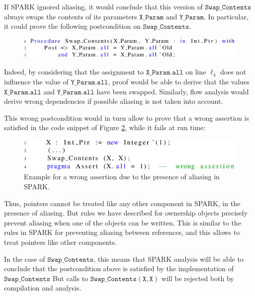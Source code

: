\documentclass{llncs}
\newcommand\var[1]{\ensuremath{\mathtt{#1}}}
\begin{document}
If SPARK ignored aliasing, it would conclude that this version of \var{Swap\_Contents} always swaps the contents of its parameters \var{X\_Param} and \var{Y\_Param}.
In particular, it could prove the following postcondition on \var{Swap\_Contents}.

\begin{figure}[htb!]
\centering
  \captionsetup{justification=centering,margin=0.6cm}
   \includegraphics[]{spark_ex1_proof}
   \label{fig:spark_ex1_proof}
\end{figure}

Indeed, by considering that the assignment to \var{X\_Param.all} on line $\ell_4$ does not influence the value of \var{Y\_Param.all}, proof would be able to
derive that the values \var{X\_Param.all} and \var{Y\_Param.all} have been swapped. Similarly, flow analysis would derive wrong dependencies if possible aliasing is not taken into account.

This wrong postcondition would in turn allow to prove that a wrong assertion is satisfied in the code snippet of Figure \ref{fig:spark_ex1_exp}, while it fails at run time:

\begin{figure}[htb!]
\centering
  \captionsetup{justification=centering,margin=0.6cm}
   \includegraphics[]{spark_ex1_exp}
	\caption{Example for a wrong assertion due to the presence of aliasing in SPARK.}
   \label{fig:spark_ex1_exp}
\end{figure}

Thus, pointers cannot be treated like any other component in SPARK, in the presence of aliasing. But rules we have described for ownership objects precisely prevent
aliasing when one of the objects can be written. This is similar to the rules in SPARK for preventing aliasing between references, and this allows to treat pointers
like other components.

In the case of \var{Swap\_Contents}, this means that SPARK analysis will be able to conclude that the postcondition above is satisfied by the implementation of \var{Swap\_Contents}
But calls to \var{Swap\_Contents(X,X)} will be rejected both by compilation and analysis.
\end{document}
